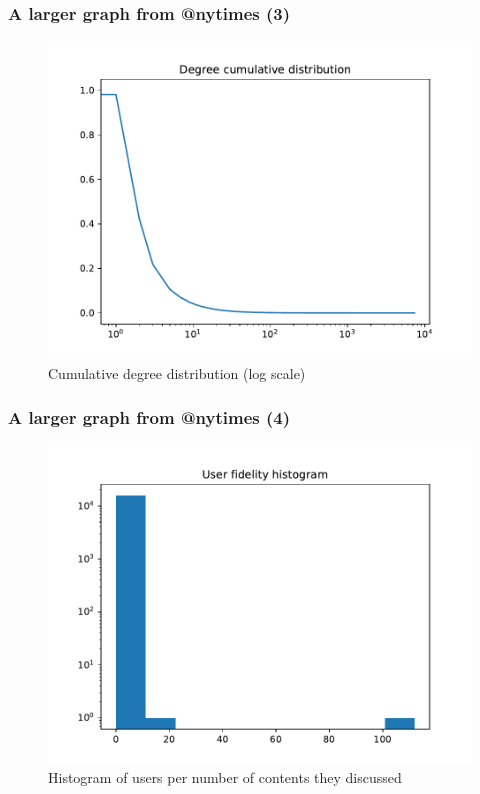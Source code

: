 \documentclass{beamer}
\begin{document}
\begin{frame}[c]
    \frametitle{A larger graph from @nytimes (3)}
    \begin{figure}[htpb]
        \centering
        \includegraphics[width=0.8\linewidth]{out/nytimes400/nytimes400-degree-dist.pdf}
        \caption{Cumulative degree distribution (log scale)}%
    \end{figure}
\end{frame}

\begin{frame}[c]
    \frametitle{A larger graph from @nytimes (4)}
    \begin{figure}[htpb]
        \centering
        \includegraphics[width=0.8\linewidth]{out/nytimes400/nytimes400-fidelity-hist.pdf}
        \caption{Histogram of users per number of contents they discussed}%
    \end{figure}
\end{frame}
\end{document}
